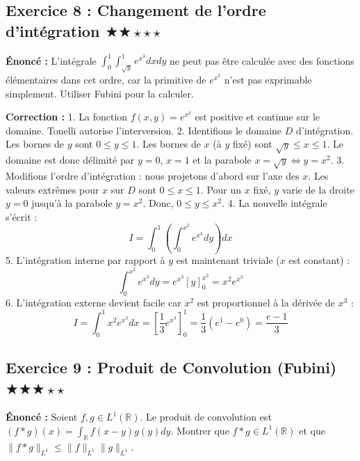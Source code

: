 \documentclass[11pt,a4paper]{article}
\begin{document}
\subsection*{Exercice 8 : Changement de l'ordre d'intégration \quad $\bigstar\bigstar\star\star\star$}

\textbf{Énoncé :}
L'intégrale $\int_0^1 \int_{\sqrt{y}}^1 e^{x^3} dx dy$ ne peut pas être calculée avec des fonctions élémentaires dans cet ordre, car la primitive de $e^{x^3}$ n'est pas exprimable simplement. Utiliser Fubini pour la calculer.

\textbf{Correction :}
1. La fonction $f(x,y) = e^{x^3}$ est positive et continue sur le domaine. Tonelli autorise l'interversion.
2. Identifions le domaine $D$ d'intégration.
   Les bornes de $y$ sont $0 \le y \le 1$.
   Les bornes de $x$ (\`a $y$ fixé) sont $\sqrt{y} \le x \le 1$.
   Le domaine est donc délimité par $y=0$, $x=1$ et la parabole $x = \sqrt{y} \iff y = x^2$.
3. Modifions l'ordre d'intégration : nous projetons d'abord sur l'axe des $x$.
   Les valeurs extrêmes pour $x$ sur $D$ sont $0 \le x \le 1$.
   Pour un $x$ fixé, $y$ varie de la droite $y=0$ jusqu'\`a la parabole $y=x^2$.
   Donc, $0 \le y \le x^2$.
4. La nouvelle intégrale s'écrit :
   $$ I = \int_0^1 \left( \int_0^{x^2} e^{x^3} dy \right) dx $$
5. L'intégration interne par rapport \`a $y$ est maintenant triviale ($x$ est constant) :
   $$ \int_0^{x^2} e^{x^3} dy = e^{x^3} [y]_0^{x^2} = x^2 e^{x^3} $$
6. L'intégration externe devient facile car $x^2$ est proportionnel \`a la dérivée de $x^3$ :
   $$ I = \int_0^1 x^2 e^{x^3} dx = \left[ \frac{1}{3} e^{x^3} \right]_0^1 = \frac{1}{3}(e^1 - e^0) = \frac{e-1}{3} $$


\subsection*{Exercice 9 : Produit de Convolution (Fubini) \quad $\bigstar\bigstar\bigstar\star\star$}

\textbf{Énoncé :}
Soient $f, g \in L^1(\mathbb{R})$. Le produit de convolution est $(f * g)(x) = \int_{\mathbb{R}} f(x-y)g(y) dy$.
Montrer que $f * g \in L^1(\mathbb{R})$ et que $\|f * g\|_{L^1} \le \|f\|_{L^1} \|g\|_{L^1}$.
\end{document}
